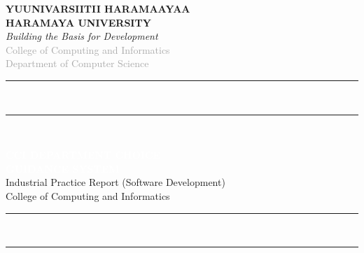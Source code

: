 ﻿\documentclass[12pt, a4paper]{article}
\begin{document}
\begin{titlepage}
\begin{center}
{\large\bfseries\textcolor{uniblue}{YUUNIVARSIITII HARAMAAYAA}}\\[0.1cm]
{\Large\bfseries\textcolor{uniblue}{HARAMAYA UNIVERSITY}}\\[0.05cm]
{\small\itshape\textcolor{unigreen}{Building the Basis for Development}}\\[0.3cm]
{\normalsize\textcolor{darkgray}{College of Computing and Informatics}}\\[0.05cm]
{\normalsize\textcolor{darkgray}{Department of Computer Science}}\\[0.3cm]

{\color{uniblue}\rule{0.78\textwidth}{2.5pt}}\\[0.1cm]
{\color{unigreen}\rule{0.78\textwidth}{1pt}}\\[0.3cm]

\begin{tcolorbox}[
    enhanced, colback=uniblue, colframe=accentgold,
    arc=4pt, boxrule=1.5pt, width=0.82\textwidth,
    halign=center, top=10pt, bottom=10pt
]
    {\LARGE\bfseries\textcolor{white}{CCI DEPARTMENT CHOICE}}\\[2pt]
    {\LARGE\bfseries\textcolor{white}{GUIDANCE SYSTEM}}\\[6pt]
    {\normalsize\textcolor{white!80!gray}{Industrial Practice Report (Software Development)}}\\[3pt]
    {\small\textcolor{white!70!gray}{College of Computing and Informatics}}
\end{tcolorbox}

\vspace{0.2cm}
{\color{unigreen}\rule{0.78\textwidth}{1pt}}\\[0.08cm]
{\color{uniblue}\rule{0.78\textwidth}{2.5pt}}\\[0.3cm]


\end{center}
\end{titlepage}
\end{document}
